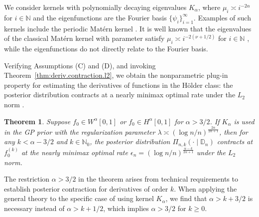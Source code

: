\documentclass[12pt]{article}
\newcommand\data{\mathbb{D}_n}
\theoremstyle{plain}
\newtheorem{theorem}{Theorem}
\theoremstyle{nonitalicremark}
\begin{document}
We consider kernels with polynomially decaying eigenvalues $K_\alpha$, where
$
\mu_i\asymp i^{-2\alpha}$ for $i\in\mathbb{N} 
$
and the eigenfunctions are the Fourier basis $\{\psi_i\}_{i=1}^\infty$. Examples of such kernels include the periodic Mat\'ern kernel \citep{giordano2022nonparametric}. It is well known that the eigenvalues of the classical Mat\'ern kernel with parameter satisfy $\mu_i \asymp i^{-2(\nu+1/2)}$ for $i \in \mathbb{N}$ \citep{seeger2008information,santin2016approximation}, while the eigenfunctions do not directly relate to the Fourier basis.



Verifying Assumptions (C) and (D), and invoking Theorem~\ref{thm:deriv.contraction.l2}, we obtain the nonparametric plug-in property for estimating the derivatives of functions in the H\"older class: the posterior distribution contracts at a nearly minimax optimal rate under the $L_2$ norm \citep{stone1982optimal}.

\begin{theorem}\label{thm:contraction.deriv}
Suppose $f_0 \in W^\alpha[0,1]$ or $f_0\in H^\alpha[0,1]$ for $\alpha>3/2$. If $K_\alpha$ is used in the GP prior with the regularization parameter $\lambda\asymp ({\log n}/{n})^{\frac{2\alpha}{2\alpha+1}}$, then for any $k<\alpha-3/2$ and $k\in\mathbb{N}_0$, the posterior distribution $\Pi_{n,k}(\cdot\mid\data)$ contracts at $f_0^{(k)}$ at the nearly minimax optimal rate $\epsilon_n = (\log n/n)^{\frac{\alpha-k}{2\alpha+1}}$ under the $L_2$ norm.
\end{theorem}

The restriction $\alpha > 3/2$ in the theorem arises from technical requirements to establish posterior contraction for derivatives of order $k$. When applying the general theory to the specific case of using kernel $K_\alpha$, we find that $\alpha > k + 3/2$ is necessary instead of $\alpha > k + 1/2$, which implies $\alpha > 3/2$ for $k \geq 0$.
\end{document}
